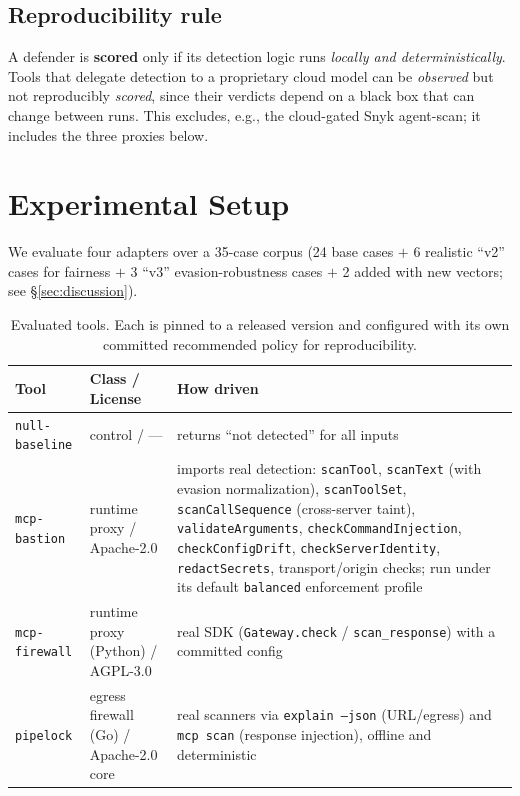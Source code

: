 \documentclass[11pt]{article}
\newcommand{\code}[1]{\texttt{\small #1}}
\begin{document}
\subsection{Reproducibility rule}
\label{sec:repro}
A defender is \textbf{scored} only if its detection logic runs \emph{locally and deterministically}. Tools that delegate detection to a proprietary cloud model can be \emph{observed} but not reproducibly \emph{scored}, since their verdicts depend on a black box that can change between runs. This excludes, e.g., the cloud-gated Snyk agent-scan; it includes the three proxies below.

\section{Experimental Setup}
\label{sec:setup}

We evaluate four adapters over a 35-case corpus (24 base cases $+$ 6 realistic ``v2'' cases for fairness $+$ 3 ``v3'' evasion-robustness cases $+$ 2 added with new vectors; see \S\ref{sec:discussion}).

\begin{table}[h]
\centering
\caption{Evaluated tools. Each is pinned to a released version and configured with its own committed recommended policy for reproducibility.}
\label{tab:tools}
\small
\begin{tabularx}{\linewidth}{@{}llX@{}}
\toprule
Tool & Class / License & How driven \\
\midrule
\code{null-baseline} & control / --- & returns ``not detected'' for all inputs \\
\code{mcp-bastion} & runtime proxy / Apache-2.0 & imports real detection: \code{scanTool}, \code{scanText} (with evasion normalization), \code{scanToolSet}, \code{scanCallSequence} (cross-server taint), \code{validateArguments}, \code{checkCommandInjection}, \code{checkConfigDrift}, \code{checkServerIdentity}, \code{redactSecrets}, transport/origin checks; run under its default \code{balanced} enforcement profile \\
\code{mcp-firewall} & runtime proxy (Python) / AGPL-3.0 & real SDK (\code{Gateway.check} / \code{scan\_response}) with a committed config \\
\code{pipelock} & egress firewall (Go) / Apache-2.0 core & real scanners via \code{explain --json} (URL/egress) and \code{mcp scan} (response injection), offline and deterministic \\
\bottomrule
\end{tabularx}
\end{table}
\end{document}
